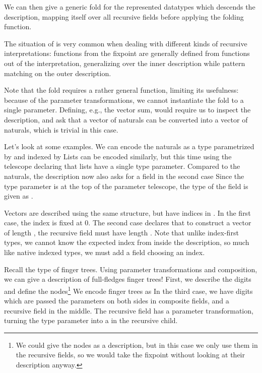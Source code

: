 We can then give a generic fold for the represented datatypes
which descends the description, mapping itself over all recursive fields before applying the folding function.
\begin{remark}
    The situation of  is very common when dealing with different kinds of recursive interpretations: functions from the fixpoint are generally defined from functions out of the interpretation, generalizing over the inner description while pattern matching on the outer description. 
\end{remark}
Note that the fold requires a rather general function, limiting its usefulness: because of the parameter transformations, we cannot instantiate the fold to a single parameter. Defining, e.g., the vector sum, would require us to inspect the description, and ask that a vector of naturals can be converted into a vector of naturals, which is trivial in this case.


Let's look at some examples. We can encode the naturals as a type parametrized by  and indexed by 
Lists can be encoded similarly, but this time using the telescope
declaring that lists have a single type parameter. Compared to the naturals, the description now also asks for a field in the second case
Since the type parameter is at the top of the parameter telescope, the type of the field is given as .

Vectors are described using the same structure, but have indices in \bN{}.
In the first case, the index is fixed at 0. The second case declares that to construct a vector of length , the recursive field must have length . Note that unlike index-first types, we cannot know the expected index from inside the description, so much like native indexed types, we must add a field choosing an index.

Recall the type of finger trees. Using parameter transformations and composition, we can give a description of full-fledges finger trees! First, we describe the digits
and define the nodes\footnote{We could give the nodes as a description, but in this case we only use them in the recursive fields, so we would take the fixpoint without looking at their description anyway.}
We encode finger trees as
In the third case, we have digits which are passed the parameters on both sides in composite fields, and a recursive field in the middle. The recursive field has a parameter transformation, turning the type parameter  into a  in the recursive child.



